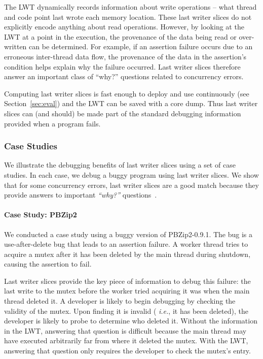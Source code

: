 \documentclass[preprint,9pt]{sigplanconf}
\newcommand{\lwt}{LWT\xspace}
\begin{document}
The \lwt dynamically records information about write operations -- what thread
and code point last wrote each memory location.   These last writer slices do
not explicitly encode anything about read operations.  However, by looking at
the \lwt at a point in the execution, the provenance of the data being read or
over-written can be determined.  For example, if an assertion failure occurs
due to an erroneous inter-thread data flow, the provenance of the data in the
assertion's condition helps explain why the failure occurred.  Last writer
slices therefore answer an important class of ``why?'' questions related to
concurrency errors.     

Computing last writer slices is fast enough to deploy and use
continuously (see Section~\ref{sec:eval}) and the \lwt can be saved with a core
dump.  Thus last writer slices can (and should) be made part of the standard
debugging information provided when a program fails.  

\subsubsection{Case Studies}

We illustrate the debugging benefits of last writer slices using a set of case
studies.  In each case, we debug a buggy program using last writer slices.  We
show that for some concurrency errors, last writer slices are a good match
because they provide answers to important {\em ``why?''}
questions~\cite{whylineicse}.  

\paragraph{Case Study: PBZip2}
We conducted a case study using a buggy version of PBZip2-0.9.1.    The bug is
a use-after-delete bug that leads to an assertion failure.  A worker thread
tries to acquire a mutex after it has been deleted by the main thread during
shutdown, causing the assertion to fail.  

Last writer slices provide the key piece of information to debug this failure: the last
write to the mutex before the worker tried acquiring it was when the main
thread deleted it.  A developer is likely to begin debugging by checking the
validity of the mutex.  Upon finding it is invalid ({\em
i.e.}, it has been deleted), the developer is likely to probe to determine who 
deleted it.  Without the information in the \lwt, answering that question is difficult
because the main thread may have executed arbitrarily far from where it deleted
the mutex.  With the \lwt, answering that question only requires the developer
to check the mutex's entry.
\end{document}
